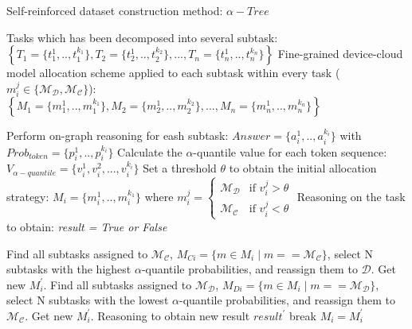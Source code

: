 \begin{algorithm}
	\caption{Self-reinforced dataset construction method: $\alpha-Tree$}
	\begin{algorithmic}[1]
         \Require  
            Tasks which has been decomposed into several subtask: 
            $\left\{T_1=\{t^1_1,..,t^{k_1}_1\}, T_2=\{t^1_2,..,t^{k_2}_2\},...,T_n=\{t^1_n,..,t^{k_n}_n\}\right\}$ 
        \Ensure  
            Fine-grained device-cloud model allocation scheme applied to each subtask within every task
            ($m_i^j\in \{\mathcal{M}_\mathcal{D},\mathcal{M}_\mathcal{C}\}$):
            $\left\{M_1=\{m^1_1,..,m^{k_1}_1\}, M_2=\{m^1_2,..,m^{k_2}_2\},...,M_n=\{m^1_n,..,m^{k_n}_n\}\right\}$ 

            
    		\State Perform on-graph reasoning for eash subtask: $Answer = \{a^1_i,..,a^{k_i}_i\}$ with $Prob_{token} = \{p^1_i,..,p^{k_i}_i\}$ 
                \State Calculate the $\alpha$-quantile value for each token sequence: $V_{\alpha-quantile} = \{v^1_i, v^2_i,...,v^{k_i}_i\}$
                \State Set a threshold $\theta$ to obtain the initial allocation strategy: $M_i=\{m^1_i,..,m^{k_1}_i\}$ where
                    $ m^j_i =
                    \begin{cases} 
                    \mathcal{M}_\mathcal{D} & \text{if } v^j_i>\theta \\ 
                    \mathcal{M}_\mathcal{C} & \text{if } v^j_i<\theta 
                    \end{cases}
                    $
                \State Reasoning on the task to obtain: \textit{result = True or False}
                
            		      \State Find all subtasks assigned to $\mathcal{M}_\mathcal{C}$, $M_{Ci} = \{ m \in M_{i} \mid m == \mathcal{M}_\mathcal{C} \}$, select N subtasks with the highest $\alpha$-quantile probabilities, and reassign them to $\mathcal{D}$. Get new $M_{i}^\prime$.
                        \Else
                            \State Find all subtasks assigned to $\mathcal{M}_\mathcal{D}$, $M_{Di} = \{ m \in M_{i} \mid m == \mathcal{M}_\mathcal{D} \}$, select N subtasks with the lowest $\alpha$-quantile probabilities, and reassign them to $\mathcal{M}_\mathcal{C}$. Get new $M_{i}^\prime$.
            		\EndIf
                        \State Reasoning to obtain new result $result^\prime$ 
                            \State break 
                        \EndIf
                        \State $M_{i} = M_{i}^\prime$
    		\EndWhile
		\EndFor
	\end{algorithmic} 
\label{algorithm}
\end{algorithm} 


